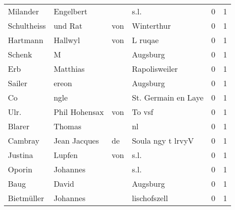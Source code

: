\begin{tabular}{llllrr}
                 Milander &                          Engelbert &             &                                        s.l. &          0 &         1 \\
              Schultheiss &                            und Rat &         von &                                  Winterthur &          0 &         1 \\
                 Hartmann &                            Hallwyl &         von &                                     L ruqae &          0 &         1 \\
                   Schenk &                                  M &             &                                    Augsburg &          0 &         1 \\
                      Erb &                           Matthias &             &                               Rapolisweiler &          0 &         1 \\
                   Sailer &                              ereon &             &                                    Augsburg &          0 &         1 \\
                       Co &                               ngle &             &                         St. Germain en Laye &          0 &         1 \\
                     Ulr. &                     Phil  Hohensax &         von &                                      To vsf &          0 &         1 \\
                   Blarer &                             Thomas &             &                                          nl &          0 &         1 \\
                  Cambray &                       Jean Jacques &          de &                           Soula ngy t lrvyV &          0 &         1 \\
                  Justina &                             Lupfen &         von &                                        s.l. &          0 &         1 \\
                   Oporin &                           Johannes &             &                                        s.l. &          0 &         1 \\
                     Baug &                              David &             &                                    Augsburg &          0 &         1 \\
               Bietmüller &                           Johannes &             &                                lischofszell &          0 &         1 \\

\end{tabular}
